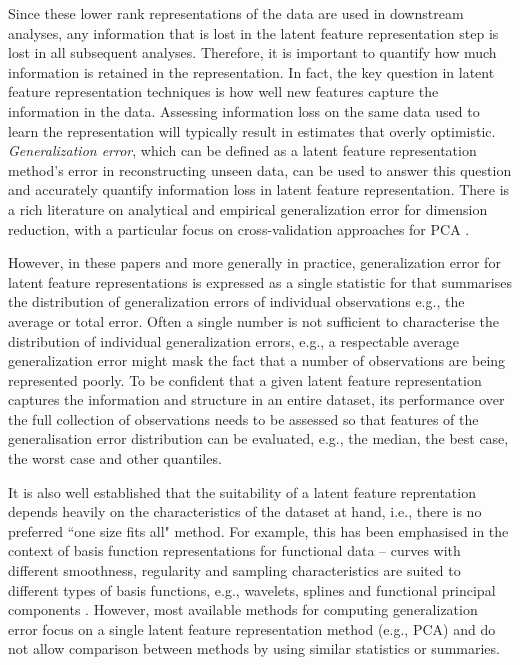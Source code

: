 Since these lower rank representations of the data are used in downstream analyses, any information that is lost in the latent feature representation step is lost in all subsequent analyses. Therefore, it is important to quantify how much information is retained in the representation. 
In fact, the key question in latent feature representation techniques is how well new features capture the information in the data.
Assessing information loss on the same data used to learn the representation will typically result in estimates that overly optimistic.
\emph{Generalization error}, which can be defined as a latent feature representation method's error in reconstructing unseen data, can be used to answer this question and accurately quantify information loss in latent feature representation. 
There is a rich literature on analytical and empirical generalization error for dimension reduction, with a particular focus on cross-validation approaches for PCA \parencite[see, e.g.,][]{becht_dimensionality_2019, wold_cross-validatory_1978, eastment_cross-validatory_1982,krzanowski_cross-validation_1987, minka_automatic_2000, rajan_bayesian_1994, camacho_cross-validation_2014, diana_cross-validation_2002, hubert_fast_2007, josse_selecting_2012, saccenti_use_2015}.

However, in these papers and more generally in practice, generalization error for latent feature representations is expressed as a single statistic for that summarises the distribution of generalization errors of individual observations e.g., the average or total error.
Often a single number is not sufficient to characterise the distribution of individual generalization errors, e.g., a respectable average generalization error might mask the fact that a number of observations are being represented poorly. 
To be confident that a given latent feature representation captures the information and structure in an entire dataset, its performance over the full collection of observations needs to be assessed so that features of the generalisation error distribution can be evaluated, e.g., the median, the best case, the worst case and other quantiles.

It is also well established that the suitability of a latent feature reprentation depends heavily on the characteristics of the dataset at hand, i.e., there is no preferred ``one size fits all" method.
For example, this has been emphasised in the context of basis function representations for functional data -- curves with different smoothness, regularity and sampling characteristics are suited to different types of basis functions, e.g., wavelets, splines and functional principal components \textcite[Section 3, pp. 325--328]{morris_functional_2015}.
However, most available methods for computing generalization error focus on a single latent feature representation method (e.g., PCA) and do not allow comparison between methods by using similar statistics or summaries.


